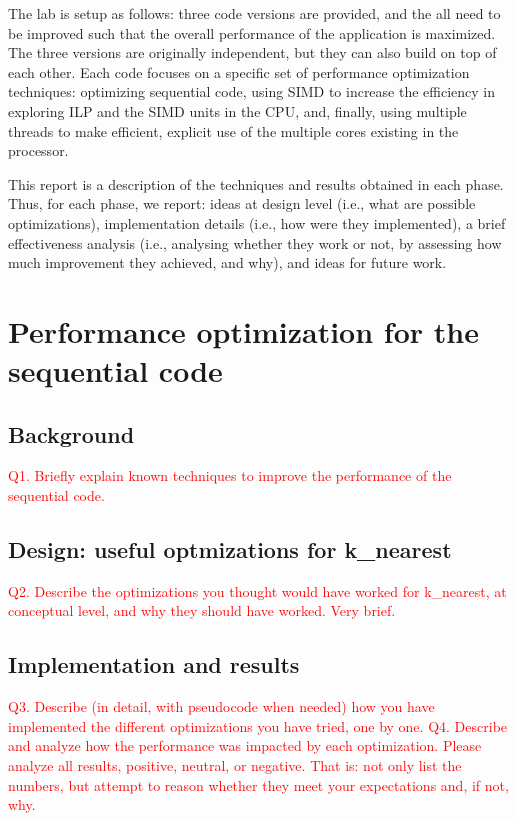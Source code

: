 \documentclass[11pt]{article}
\newcommand \question[1]{\textcolor{red}{#1}}
\begin{document}
The lab is setup as follows: three code versions are provided, and the all need to be improved such that the overall performance of the application is maximized. The three versions are originally independent, but they can also build on top of each other. Each code focuses on a specific set of performance optimization techniques: optimizing sequential code, using SIMD to increase the efficiency in exploring ILP and the SIMD units in the CPU, and, finally, using multiple threads to make efficient, explicit use of the multiple cores existing in the processor. 

This report is a description of the techniques and results obtained in each phase. Thus, for each phase, we report: ideas at design level (i.e., what are possible optimizations), implementation details (i.e., how were they implemented), a brief effectiveness analysis (i.e., analysing whether they work or not, by assessing how much improvement they achieved, and why), and ideas for future work. 

\section{Performance optimization for the sequential code}

\subsection{Background}
\question{Q1. Briefly explain known techniques to improve the performance of the sequential code.}

\subsection{Design: useful optmizations for k\_nearest}
\question{Q2. Describe the optimizations you thought would have worked for k\_nearest, at conceptual level, and why they should have worked. Very brief.}

\subsection{Implementation and results}

\question{Q3. Describe (in detail, with pseudocode when needed) how you have implemented the different optimizations you have tried, one by one.}
\question{Q4. Describe and analyze how the performance was impacted by each optimization. Please analyze all results, positive, neutral, or negative. That is: not only list the numbers, but attempt to reason whether they meet your expectations and, if not, why.}
\end{document}
